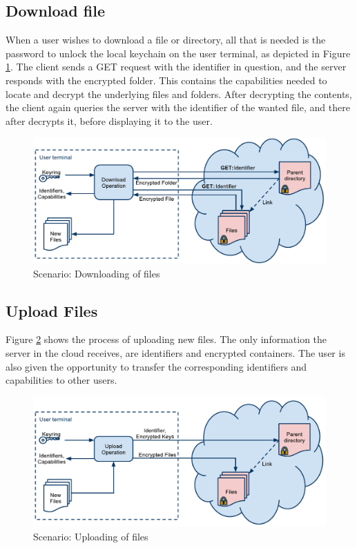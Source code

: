 \documentclass[pdftex,english,10pt,b5paper,twoside]{book}
\begin{document}
\subsection{Download file}

When a user wishes to download a file or directory, all that is needed is the
password to unlock the local keychain on the user terminal, as depicted in Figure
\ref{fig:AS:download}. The client sends a GET request with the identifier in
question, and the server responds with the encrypted folder. This contains the
capabilities needed to locate and decrypt the underlying files and folders.
After decrypting the contents, the client again queries the server with the
identifier of the wanted file, and there after decrypts it, before displaying it
to the user.

\begin{figure}[h!]
    \centering
    \includegraphics[width=\columnwidth]{ArchitectureDownload.pdf}
    \caption{Scenario: Downloading of files}
    \label{fig:AS:download}
\end{figure}

\subsection{Upload Files}

Figure \ref{fig:AS:upload} shows the process of uploading new files. The only
information the server in the cloud receives, are identifiers and encrypted
containers. The user is also given the opportunity to transfer the corresponding
identifiers and capabilities to other users.

\begin{figure}[h!]
    \centering
    \includegraphics[width=\columnwidth]{ArchitectureUpload.pdf}
    \caption{Scenario: Uploading of files}
    \label{fig:AS:upload}
\end{figure}
\end{document}
